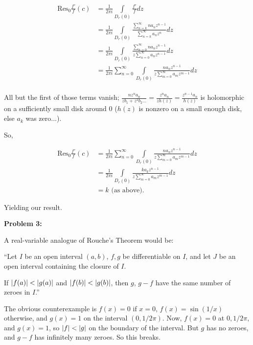 \documentclass[a4paper,12pt]{article}
\begin{document}
\begin{align*} %
\text{Res}_0 \frac{f'}{f} (c) &= \frac{1}{2\pi i} \int\limits_{D_r(0)} \frac{f'}{f} dz\\
&= \frac{1}{2\pi i} \int\limits_{D_r(0)} \frac{\sum\limits_{n=k}^\infty na_nz^{n-1}}{\sum\limits_{n=k}^\infty a_nz^n} dz\\
&= \frac{1}{2\pi i} \int\limits_{D_r(0)} \frac{\sum\limits_{n=0}^\infty na_nz^{n-1}}{z\sum\limits_{n=0}^\infty a_{n}z^{n-1}} dz\\
&= \frac{1}{2\pi i} \sum\limits_{n=0}^\infty \int\limits_{D_r(0)} \frac{na_nz^{n-1}}{z\sum\limits_{m=0}^\infty a_{m}z^{m-1}} dz\\
\end{align*} 

All but the first of those terms vanish; $\frac{nz^na_n}{zb_1 + z^2b_2 \ldots } = \frac{z^na_n}{zh(z)} = \frac{z^{n-1}a_n}{h(z)}$ is holomorphic on a sufficiently small disk around $0$ ($h(z)$ is nonzero on a small enough disk, else $a_k$ was zero...).

So, 

\begin{align*}
\text{Res}_0 \frac{f'}{f} (c) &= \frac{1}{2\pi i} \sum\limits_{n=0}^\infty \int\limits_{D_r(0)} \frac{na_nz^{n-1}}{z\sum\limits_{m=0}^\infty a_{m}z^{m-1}} dz\\
&= \frac{1}{2\pi i} \int\limits_{D_r(0)} \frac{ka_kz^{n-1}}{z\sum\limits_{m=0}^\infty a_{m}z^{m-1}} dz\\
&= k \text{ (as above).}
\end{align*}

Yielding our result. 

\shunt

{\bf Problem 3:}

A real-variable analogue of Rouche's Theorem would be:

``Let $I$ be an open interval $(a,b)$, $f,g$ be differentiable on $I$, and let $J$ be an open interval containing the closure of $I$.

If $\left\lvert f(a) \right\rvert < \left\lvert g(a) \right\rvert$ and $\left\lvert f(b) \right\rvert < \left\lvert g(b) \right\rvert$, then $g$, $g-f$ have the same number of zeroes in $I$.''

The obvious counterexample is $f(x) = 0$ if $x = 0$, $f(x) = \sin(1/x)$ otherwise, and $g(x) =1$ on the interval $(0,1/2\pi)$. Now, $f(x) = 0$ at $0,1/2\pi$, and $g(x) =1$, so $\left\lvert f \right\rvert < \left\lvert g \right\rvert$ on the boundary of the interval. But $g$ has no zeroes, and $g-f$ has infinitely many zeroes. So this breaks.
\end{document}
